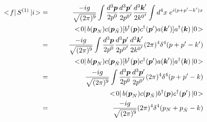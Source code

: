 \begin{eqnarray}
\bra f \braend S^{(1)} \ketend i \ket
&=&
\frac{-ig}{\sqrt{(2\pi)^9}} 
\int
\frac{d^3 \bld{p}}{2p^0}
\frac{d^3 \bld{p}'}{2{p^0}'}
\frac{d^3 \bld{k}'}{2{k^0}'}
\int 
d^4 x\;
e^{i(p + p' - k') x}
\nonumber\\
&&
\hspace{10mm}
\bra 0 \braend b(\bld{p}_N) c(\bld{p}_{\bar{N}})
[b^\dagger(\bld{p}) c^\dagger (\bld{p}')a(\bld{k}')]
 a^\dagger(\bld{k}) \ketend 0 \ket
\nonumber\\
&=&
\frac{-ig}{\sqrt{(2\pi)^9}} 
\int
\frac{d^3 \bld{p}}{2p^0}
\frac{d^3 \bld{p}'}{2{p^0}'}
\frac{d^3 \bld{k}'}{2{k^0}'}
(2\pi)^4 \delta^4(p + p' - k')
\nonumber\\
&&
\hspace{10mm}
\bra 0 \braend b(\bld{p}_N) c(\bld{p}_{\bar{N}})
[b^\dagger(\bld{p}) c^\dagger (\bld{p}')a(\bld{k}')]
 a^\dagger(\bld{k}) \ketend 0 \ket
\nonumber\\
&=&
\frac{-ig}{\sqrt{(2\pi)^9}} 
\int
\frac{d^3 \bld{p}}{2p^0}
\frac{d^3 \bld{p}'}{2{p^0}'}
(2\pi)^4 \delta^4(p + p' - k)
\nonumber\\
&&
\hspace{20mm}
\bra 0 \braend b(\bld{p}_N) c(\bld{p}_{\bar{N}})
b^\dagger(\bld{p}) c^\dagger (\bld{p}')
 \ketend 0 \ket
\nonumber\\
&=&
\frac{-ig}{\sqrt{(2\pi)^9}} 
(2\pi)^4 \delta^4(p_N + p_{\bar{N}} - k)
 \label{eqn:scYmesonDcySmtrx}
\end{eqnarray}

